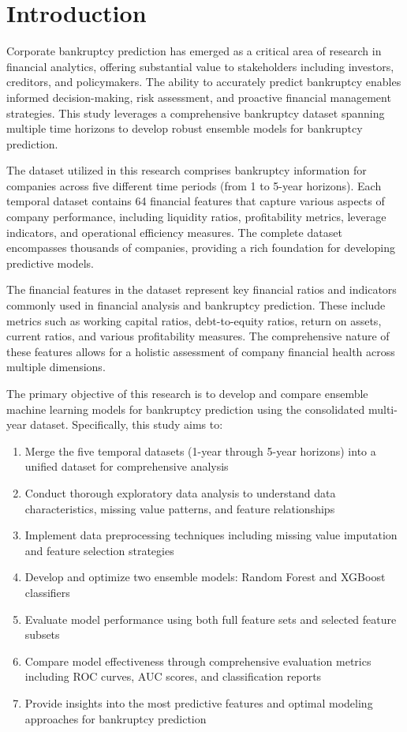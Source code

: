 \chapter{Introduction}

Corporate bankruptcy prediction has emerged as a critical area of research in financial analytics, offering substantial value to stakeholders including investors, creditors, and policymakers. The ability to accurately predict bankruptcy enables informed decision-making, risk assessment, and proactive financial management strategies. This study leverages a comprehensive bankruptcy dataset spanning multiple time horizons to develop robust ensemble models for bankruptcy prediction.

The dataset utilized in this research comprises bankruptcy information for companies across five different time periods (from 1 to 5-year horizons). Each temporal dataset contains 64 financial features that capture various aspects of company performance, including liquidity ratios, profitability metrics, leverage indicators, and operational efficiency measures. The complete dataset encompasses thousands of companies, providing a rich foundation for developing predictive models.

The financial features in the dataset represent key financial ratios and indicators commonly used in financial analysis and bankruptcy prediction. These include metrics such as working capital ratios, debt-to-equity ratios, return on assets, current ratios, and various profitability measures. The comprehensive nature of these features allows for a holistic assessment of company financial health across multiple dimensions.

The primary objective of this research is to develop and compare ensemble machine learning models for bankruptcy prediction using the consolidated multi-year dataset. Specifically, this study aims to:

\begin{enumerate}
    \item Merge the five temporal datasets (1-year through 5-year horizons) into a unified dataset for comprehensive analysis
    \item Conduct thorough exploratory data analysis to understand data characteristics, missing value patterns, and feature relationships
    \item Implement data preprocessing techniques including missing value imputation and feature selection strategies
    \item Develop and optimize two ensemble models: Random Forest and XGBoost classifiers
    \item Evaluate model performance using both full feature sets and selected feature subsets
    \item Compare model effectiveness through comprehensive evaluation metrics including ROC curves, AUC scores, and classification reports
    \item Provide insights into the most predictive features and optimal modeling approaches for bankruptcy prediction
\end{enumerate}

